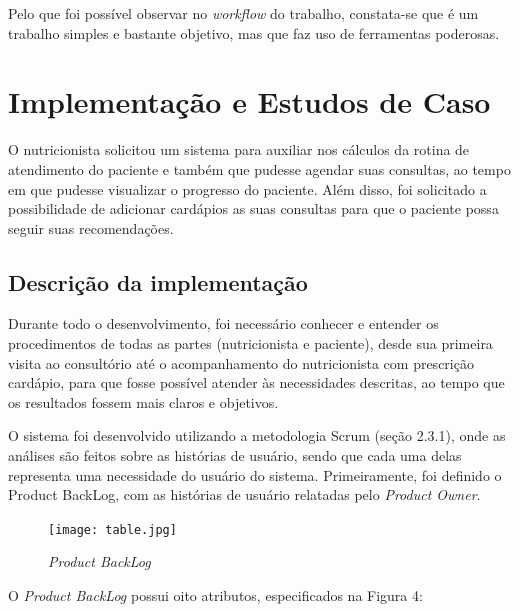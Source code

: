 \documentclass[
	12pt,				%
    oneside,			%
	a4paper,			%
	english,			%
	french,				%
	spanish,			%
	brazil,				%
	]{abntex2}
\begin{document}
Pelo que foi possível observar no \textit{workflow} do trabalho, constata-se que é um trabalho simples e bastante objetivo, mas que faz uso de ferramentas poderosas.



\chapter{Implementação e Estudos de Caso}

O nutricionista solicitou um sistema para auxiliar nos cálculos da rotina
de atendimento do paciente e também que pudesse agendar suas consultas, ao
tempo em que pudesse visualizar o progresso do paciente. Além disso, foi solicitado a possibilidade de adicionar cardápios as suas consultas para que o paciente possa seguir
suas recomendações. 

\section{Descrição da implementação}

Durante todo o desenvolvimento, foi necessário conhecer e entender os
procedimentos de todas as partes (nutricionista e paciente), desde sua primeira visita
ao consultório até o acompanhamento do nutricionista com prescrição cardápio, para
que fosse possível atender às necessidades descritas, ao tempo que os resultados
fossem mais claros e objetivos.

O sistema foi desenvolvido utilizando a metodologia Scrum (seção 2.3.1),
onde as análises são feitos sobre as histórias de usuário, sendo que cada uma delas
representa uma necessidade do usuário do sistema. Primeiramente, foi definido o
Product BackLog, com as histórias de usuário relatadas pelo \textit{Product Owner}.

\begin{figure} [hbt] 
\label{table1} 
\caption{\textit{Product BackLog}}
\begin{center}
\texttt{[image: table.jpg]}
\end{center}
\end{figure}

O \textit{Product BackLog} possui oito atributos, especificados na Figura 4:
\end{document}
